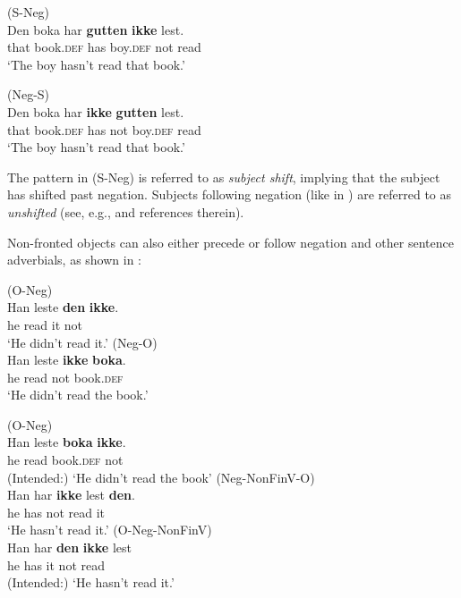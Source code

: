 \documentclass[output=paper]{langscibook}
\begin{document}
\ea \label{ex:larsson:2}
\ea (S-Neg)\label{ex:larsson:2a}\\
\gll Den boka har \textbf{gutten} \textbf{ikke} lest.\\
     that book.\textsc{def} has boy.\textsc{def} not read\\
\glt ‘The boy hasn’t read that book.’

\ex (Neg-S)\label{ex:larsson:2b}\\
\gll Den boka har \textbf{ikke} \textbf{gutten} lest.\\
	 that book.\textsc{def} has not boy.\textsc{def} read\\
\glt ‘The boy hasn’t read that book.’
\z
\z

The pattern in  (S-Neg) is referred to as \textit{subject shift}, implying that the subject has shifted past negation. Subjects following negation (like in ) are referred to as \textit{unshifted} (see, e.g., \citealt{LundquistTengesdal2022} and references therein). 

Non-fronted objects can also either precede or follow negation and other sentence adverbials, as shown in : 

\ea\label{ex:larsson:3}
\ea (O-Neg)\label{ex:larsson:3a}\\
\gll Han leste \textbf{den} \textbf{ikke}.\\
     he read it not\\
\glt ‘He didn’t read it.’
\ex (Neg-O)\label{ex:larsson:3b}\\
\gll Han leste \textbf{ikke} \textbf{boka}.\\
    he read not book.\textsc{def}\\
\glt  ‘He didn’t read the book.’ 

\ex (O-Neg)\label{ex:larsson:3c}\\
\gll * Han leste \textbf{boka} \textbf{ikke}.\\
     {} he read book.\textsc{def} not \\
\glt (Intended:) ‘He didn’t read the book’
\ex (Neg-NonFinV-O)\label{ex:larsson:3d}\\
\gll Han har \textbf{ikke} lest \textbf{den}.\\
    he has not read it\\
\glt ‘He hasn’t read it.’
\ex (O-Neg-NonFinV)\label{ex:larsson:3e}\\
\gll * Han har \textbf{den} \textbf{ikke} lest\\
     {} he has it not read\\
\glt   (Intended:) ‘He hasn’t read it.’
\z
\z
\end{document}
